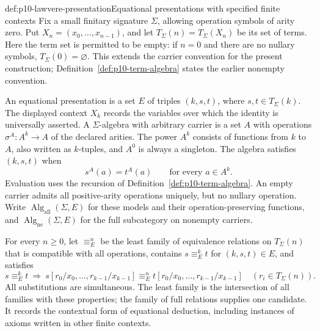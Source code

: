 \begin{hbdefinition}{def:p10-lawvere-presentation}{Equational presentations with specified finite contexts}
Fix a small finitary signature \(\Sigma\), allowing operation symbols
of arity zero.  Put \(X_n=(x_0,\ldots,x_{n-1})\), and let
\(T_\Sigma(n)=T_\Sigma(X_n)\) be its set of terms.
Here the term set is permitted to be empty: if \(n=0\) and there
are no nullary symbols, \(T_\Sigma(0)=\varnothing\).
This extends the carrier convention for the present construction;
Definition~\ref{def:p10-term-algebra} states the earlier nonempty
convention.

An equational presentation is a set \(E\) of triples
\((k,s,t)\), where \(s,t\in T_\Sigma(k)\).
The displayed context \(X_k\) records the variables over which
the identity is universally asserted.
A \(\Sigma\)-algebra with arbitrary carrier is a set \(A\) with
operations \(\sigma^A:A^k\to A\) of the declared arities.
The power \(A^k\) consists of functions from \(k\) to \(A\),
also written as \(k\)-tuples, and \(A^0\) is always a singleton.
The algebra satisfies \((k,s,t)\) when
\[
                     s^A(a)=t^A(a)\qquad\text{for every }a\in A^k.
\]
Evaluation uses the recursion of Definition~\ref{def:p10-term-algebra}.
An empty carrier admits all positive-arity operations uniquely,
but no nullary operation.
Write \(\operatorname{Alg}_{\mathrm{all}}(\Sigma,E)\) for these
models and their operation-preserving functions, and
\(\operatorname{Alg}_{\mathrm{ne}}(\Sigma,E)\) for the full
subcategory on nonempty carriers.

For every \(n\geq0\), let \(\equiv_E^n\) be the least family of
equivalence relations on \(T_\Sigma(n)\) that is compatible with
all operations, contains \(s\equiv_E^k t\) for \((k,s,t)\in E\),
and satisfies
\[
 s\equiv_E^k t
 \ \Longrightarrow\
 s[r_0/x_0,\ldots,r_{k-1}/x_{k-1}]
       \equiv_E^n
 t[r_0/x_0,\ldots,r_{k-1}/x_{k-1}]
       \quad(r_i\in T_\Sigma(n)).
\]
All substitutions are simultaneous.
The least family is the intersection of all families with these
properties; the family of full relations supplies one candidate.
It records the contextual form of equational deduction, including
instances of axioms written in other finite contexts.
\end{hbdefinition}

